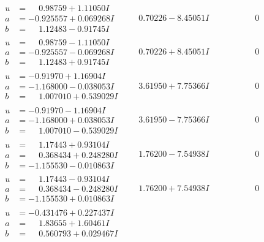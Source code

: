 \documentclass[1p]{elsarticle_modified}
\theoremstyle{definition}
\begin{document}
$$\begin{array}{c|c|c}
\begin{aligned}
u &= \phantom{-}0.98759 + 1.11050 I \\
a &= -0.925557 + 0.069268 I \\
b &= \phantom{-}1.12483 - 0.91745 I\end{aligned}
 & \phantom{-}0.70226 - 8.45051 I & \phantom{-0.000000 } 0 \\ \hline\begin{aligned}
u &= \phantom{-}0.98759 - 1.11050 I \\
a &= -0.925557 - 0.069268 I \\
b &= \phantom{-}1.12483 + 0.91745 I\end{aligned}
 & \phantom{-}0.70226 + 8.45051 I & \phantom{-0.000000 } 0 \\ \hline\begin{aligned}
u &= -0.91970 + 1.16904 I \\
a &= -1.168000 - 0.038053 I \\
b &= \phantom{-}1.007010 + 0.539029 I\end{aligned}
 & \phantom{-}3.61950 + 7.75366 I & \phantom{-0.000000 } 0 \\ \hline\begin{aligned}
u &= -0.91970 - 1.16904 I \\
a &= -1.168000 + 0.038053 I \\
b &= \phantom{-}1.007010 - 0.539029 I\end{aligned}
 & \phantom{-}3.61950 - 7.75366 I & \phantom{-0.000000 } 0 \\ \hline\begin{aligned}
u &= \phantom{-}1.17443 + 0.93104 I \\
a &= \phantom{-}0.368434 + 0.248280 I \\
b &= -1.155530 - 0.010863 I\end{aligned}
 & \phantom{-}1.76200 - 7.54938 I & \phantom{-0.000000 } 0 \\ \hline\begin{aligned}
u &= \phantom{-}1.17443 - 0.93104 I \\
a &= \phantom{-}0.368434 - 0.248280 I \\
b &= -1.155530 + 0.010863 I\end{aligned}
 & \phantom{-}1.76200 + 7.54938 I & \phantom{-0.000000 } 0 \\ \hline\begin{aligned}
u &= -0.431476 + 0.227437 I \\
a &= \phantom{-}1.83655 + 1.60461 I \\
b &= \phantom{-}0.560793 + 0.029467 I\end{aligned}

\end{array}$$
\end{document}

